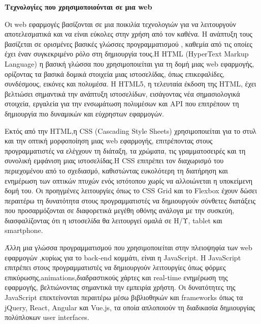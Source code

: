 \begin{center}
    \textbf{Τεχνολογίες  που χρησιμοποιούνται σε μια \lt web }
\end{center}
Οι \lt web \gt εφαρμογές βασίζονται σε μια ποικιλία τεχνολογιών για να λειτουργούν αποτελεσματικά και να είναι εύκολες στην χρήση από τον καθένα. Η ανάπτυξη τους βασίζεται σε ορισμένες βασικές γλώσσες προγραμματισμού , καθεμία από τις οποίες έχει έναν συγκεκριμένο  ρόλο στη δημιουργία τους.Η \lt HTML (HyperText Markup Language)  η βασική γλώσσα που χρησιμοποιείται για τη δομή μιας web εφαρμογής, ορίζοντας τα βασικά δομικά στοιχεία μιας ιστοσελίδας, όπως επικεφαλίδες, συνδέσμους, εικόνες και πολυμέσα. Η \lt HTML5\gt, η τελευταία έκδοση της \lt HTML\gt, έχει βελτιώσει σημαντικά την ανάπτυξη ιστοσελίδων, εισάγοντας νέα σημασιολογικά στοιχεία, εργαλεία για την ενσωμάτωση πολυμέσων και \lt API \gt που επιτρέπουν τη δημιουργία πιο δυναμικών και εύχρηστων εφαρμογών. 

Εκτός από την \lt HTML,\gt η \lt CSS (Cascading Style Sheets) \gt  χρησιμοποιείται για το στυλ και την οπτική μορφοποίηση μιας \lt web \gt εφαρμογής, επιτρέποντας στους προγραμματιστές να ελέγχουν τη διάταξη, τα χρώματα, τις γραμματοσειρές και τη συνολική εμφάνιση μιας ιστοσελίδας.Η \lt CSS \gt επιτρέπει τον διαχωρισμό του περιεχομένου από το σχεδιασμό, καθιστώντας ευκολότερη τη διατήρηση και ενημέρωση των οπτικών πτυχών ενός ιστότοπου χωρίς να αλλοιώνεται η υποκείμενη δομή του. Οι προηγμένες λειτουργίες όπως το \lt CSS Grid \gt και το \lt Flexbox \gt έχουν δώσει περαιτέρω τη δυνατότητα στους προγραμματιστές να δημιουργούν σύνθετες διατάξεις που προσαρμόζονται σε διαφορετικά μεγέθη οθόνης ανάλογα με την  συσκεύη, διασφαλίζοντας ότι η ιστοσελίδα θα λειτουργεί ομαλά σε Η/Υ, \lt tablet \gt και \lt smartphone.\gt

Άλλη μια γλώσσα προγραμματισμού που χρησιμοποιείται στην πλειοψηφία των \lt web \gt εφαρμογών ,κυρίως για το \lt back-end \gt κομμάτι, είναι η \lt JavaScript\gt. Η \lt JavaScript \gt επιτρέπει στους προγραμματιστές να δημιουργούν λειτουργίες όπως φόρμες επικύρωσης,\lt animations\gt,διαδραστικούς χάρτες και \lt real-time \gt ενημέρωση της εφαρμογής, βελτιώνοντας σημαντικά την εμπειρία χρήστη. Οι δυνατότητες της \lt JavaScript \gt επεκτείνονται περαιτέρω μέσω βιβλιοθηκών και frameworks όπως τα \lt jQuery, React, Angular \gt και \lt Vue.js\gt, τα οποία απλοποιούν τη διαδικασία δημιουργίας πολύπλοκων \lt user interfaces.\gt

